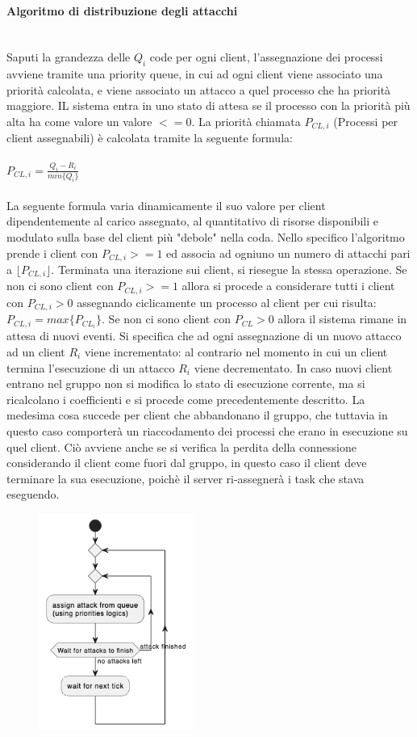 \documentclass[11pt]{article}
\begin{document}
\paragraph{Algoritmo di distribuzione degli attacchi}\mbox{}\\
Saputi la grandezza delle $Q_i$ code per ogni client, l'assegnazione dei processi avviene tramite una priority queue, in cui ad ogni client viene associato una priorità calcolata, e viene associato un attacco a quel processo che ha priorità maggiore.
IL sistema entra in uno stato di attesa se il processo con la priorità più alta ha come valore un valore $<= 0$.
La priorità chiamata $P_{CL, i}$ (Processi per client assegnabili) è calcolata tramite la seguente formula:
\\\\$P_{CL, i} = \frac{Q_i-R_i}{min\{Q_i\}}$\\\\
La seguente formula varia dinamicamente il suo valore per client dipendentemente al carico assegnato, al quantitativo di risorse disponibili e modulato sulla base del client più "debole" nella coda.
Nello specifico l'algoritmo prende i client con $P_{CL, i} >= 1$ ed associa ad ogniuno un numero di attacchi pari a $\lfloor{}P_{CL, i}\rfloor{}$. Terminata una iterazione sui client, si riesegue la stessa operazione.
Se non ci sono client con $P_{CL, i} >= 1$ allora si procede a considerare tutti i client con $P_{CL, i} > 0$ assegnando ciclicamente un processo al client per cui risulta: $P_{CL, i} = max\{P_{CL_i}\}$.
Se non ci sono client con $P_{CL}>0$ allora il sistema rimane in attesa di nuovi eventi.
Si specifica che ad ogni assegnazione di un nuovo attacco ad un client $R_i$ viene incrementato: al contrario nel momento in cui un client termina l'esecuzione di un attacco $R_i$ viene decrementato.
In caso nuovi client entrano nel gruppo non si modifica lo stato di esecuzione corrente, ma si ricalcolano i coefficienti e si procede come precedentemente descritto. La medesima cosa succede per client che abbandonano il gruppo, che tuttavia in questo caso comporterà un riaccodamento dei processi che erano in esecuzione su quel client. Ciò avviene anche se si verifica la perdita della connessione considerando il client come fuori dal gruppo, in questo caso il client deve terminare la sua esecuzione, poichè il server ri-assegnerà i task che stava eseguendo.
\begin{figure}[H]
	\centering
	\includegraphics[width=0.45\textwidth]{attack_assign.png}
\end{figure}
\end{document}
